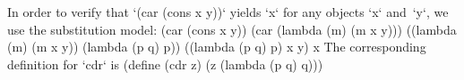 In order to verify that `(car (cons x y))` yields `x` for any objects `x` and~`y`, we use the substitution model:
\begtt\scm
(car (cons x y))
(car (lambda (m) (m x y)))
((lambda (m) (m x y)) (lambda (p q) p))
((lambda (p q) p) x y)
x
\endtt
The corresponding definition for `cdr` is
\begtt\scm
(define (cdr z)
  (z (lambda (p q) q)))
\endtt
